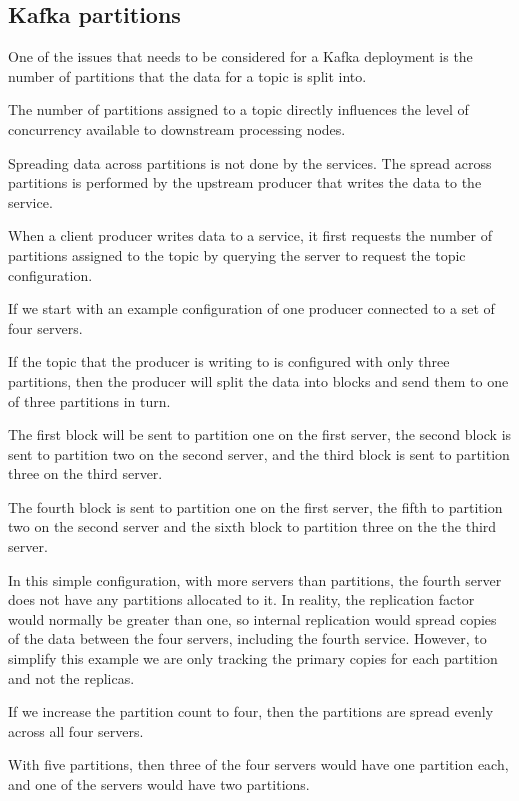 \documentclass{article}
\begin{document}
\subsection{Kafka partitions}
\label{kafka-partitions}

One of the issues that needs to be considered for a Kafka deployment is the number of partitions that the data for a topic is split into.

The number of partitions assigned to a topic directly influences
the level of concurrency available to downstream processing nodes.

Spreading data across partitions is not done by the services.
The spread across partitions is performed by the upstream producer that writes
the data to the service.

When a client producer writes data to a service, it first requests
the number of partitions assigned to the topic by querying the
server to request the topic configuration.

If we start with an example configuration of one producer connected to
a set of four servers.

If the topic that the producer is writing to is configured with only three partitions,
then the producer will split the data into blocks and send them to one of three
partitions in turn.

The first block will be sent to partition one on the first server, the second block is sent to
partition two on the second server, and the third block is sent to partition three on the third server.

The fourth block is sent to partition one on the first server,
the fifth to partition two on the second server and the sixth block to partition three on the the third server.

In this simple configuration, with more servers than partitions, the fourth server
does not have any partitions allocated to it.
In reality, the replication factor would normally be greater than one, so internal
replication would spread copies of the data between the four servers, including
the fourth service.
However, to simplify this example we are only tracking the primary copies for
each partition and not the replicas.

If we increase the partition count to four, then the partitions are spread
evenly across all four servers.

With five partitions, then three of the four servers would have one partition each,
and one of the servers would have two partitions.
\end{document}
